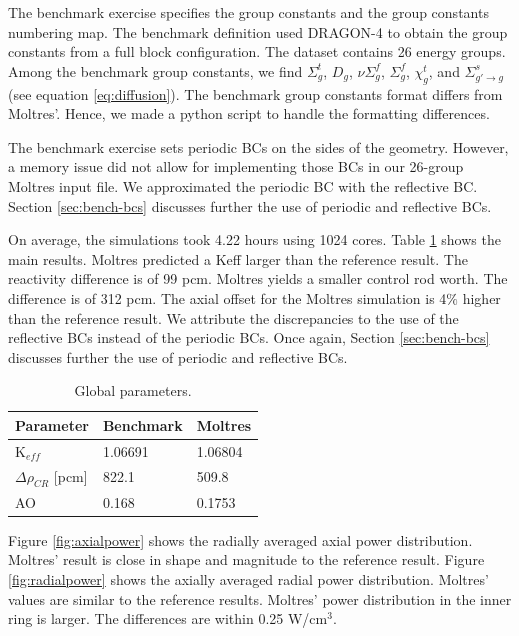 The benchmark exercise specifies the group constants and the group constants numbering map.
The benchmark definition used DRAGON-4 \cite{marleau_user_2016} to obtain the group constants from a full block configuration.
The dataset contains 26 energy groups.
Among the benchmark group constants, we find $\Sigma_g^t$, $D_g$, $\nu\Sigma_g^f$, $\Sigma_g^f$, $\chi_g^t$, and $\Sigma_{g'\rightarrow g}^s$ (see equation \ref{eq:diffusion}).
The benchmark group constants format differs from Moltres'.
Hence, we made a python script to handle the formatting differences.

The benchmark exercise sets periodic \glspl{BC} on the sides of the geometry.
However, a memory issue did not allow for implementing those BCs in our 26-group Moltres input file.
We approximated the periodic BC with the reflective BC.
Section \ref{sec:bench-bcs} discusses further the use of periodic and reflective BCs.

On average, the simulations took 4.22 hours using 1024 cores.
Table \ref{tab:globalparam} shows the main results.
Moltres predicted a \gls{Keff} larger than the reference result.
The reactivity difference is of 99 pcm.
Moltres yields a smaller control rod worth.
The difference is of 312 pcm.
The axial offset for the Moltres simulation is 4$\%$ higher than the reference result.
We attribute the discrepancies to the use of the reflective BCs instead of the periodic BCs.
Once again, Section \ref{sec:bench-bcs} discusses further the use of periodic and reflective BCs.

\begin{table}[htbp!]
  \centering
  \caption{Global parameters.}
  \begin{tabular}{l|l|l}
  \toprule
  Parameter 	&  Benchmark  &  Moltres    \\
  \midrule
  K$_{eff}$ 	&  1.06691    &  1.06804    \\
  $\Delta \rho_{CR}$ [pcm]  & 822.1 	& 509.8 \\
  AO        	&  0.168      &  0.1753     \\
  \bottomrule
  \end{tabular}
  \label{tab:globalparam}
\end{table}

Figure \ref{fig:axialpower} shows the radially averaged axial power distribution.
Moltres' result is close in shape and magnitude to the reference result.
Figure \ref{fig:radialpower} shows the axially averaged radial power distribution.
Moltres' values are similar to the reference results.
Moltres' power distribution in the inner ring is larger.
The differences are within 0.25 W/cm$^3$.


